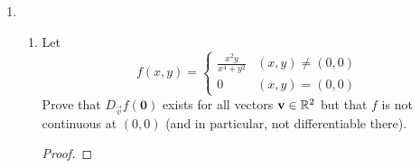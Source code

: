 \documentclass[../psets.tex]{subfiles}
\begin{document}
\begin{enumerate}
\begin{proof}
\begin{align*}
            &= \norm{\frac{f(\vec{x}_0+\lambda(\vec{x}-\vec{x}_0))-f(\vec{x}_0)-\lambda Df(\vec{x}_0)(\vec{x}-\vec{x}_0)}{\lambda}\cdot\frac{\norm{\vec{x}-\vec{x}_0}}{\norm{\vec{x}-\vec{x}_0}}}\\
            &= \norm{\frac{f(\vec{x}_0+\lambda(\vec{x}-\vec{x}_0))-f(\vec{x}_0)-Df(\vec{x}_0)(\lambda(\vec{x}-\vec{x}_0))}{\norm{\lambda(\vec{x}-\vec{x}_0)}}}\cdot\norm{\vec{x}-\vec{x}_0}\\
            &< \frac{\epsilon}{M}\cdot\norm{\vec{x}-\vec{x}_0}\\
            &\leq \frac{\epsilon}{M}\cdot M\\
            &= \epsilon
        \end{align*}
        as desired.
    \end{proof}
    \item 
    \begin{enumerate}
        \item Let
        \begin{equation*}
            f(x,y) =
            \begin{cases}
                \frac{x^2y}{x^4+y^2} & (x,y)\neq(0,0)\\
                0 & (x,y)=(0,0)
            \end{cases}
        \end{equation*}
        Prove that $D_\vec{v}f(\bm{0})$ exists for all vectors $\mathbf{v}\in\mathbb{R}^2$ but that $f$ is not continuous at $(0,0)$ (and in particular, not differentiable there).
        \begin{proof}


\end{proof}
\end{enumerate}
\end{enumerate}
\end{document}
